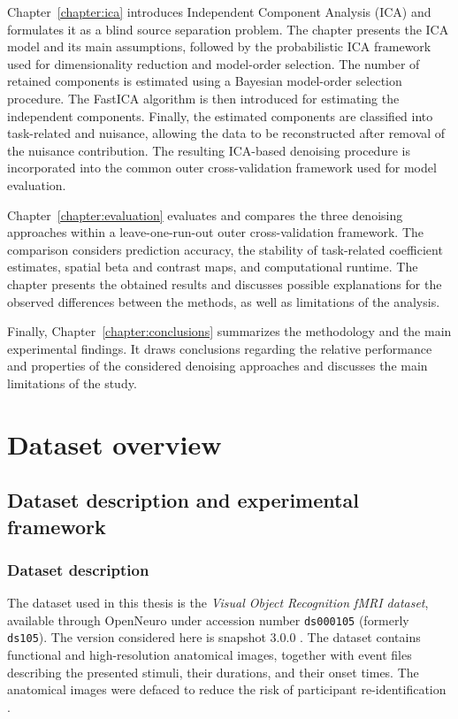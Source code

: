 \documentclass[english]{pwr_wmat_praca_dyplomowa}
\theoremstyle{definition}
\theoremstyle{remark}
\begin{document}
Chapter~\ref{chapter:ica} introduces Independent Component Analysis (ICA) and formulates it as a blind source separation problem. The chapter presents the ICA model and its main assumptions, followed by the probabilistic ICA framework used for dimensionality reduction and model-order selection. The number of retained components is estimated using a Bayesian model-order selection procedure. The FastICA algorithm is then introduced for estimating the independent components. Finally, the estimated components are classified into task-related and nuisance, allowing the data to be reconstructed after removal of the nuisance contribution. The resulting ICA-based denoising procedure is incorporated into the common outer cross-validation framework used for model evaluation.

Chapter~\ref{chapter:evaluation} evaluates and compares the three denoising approaches within a leave-one-run-out outer cross-validation framework. The comparison considers prediction accuracy, the stability of task-related coefficient estimates, spatial beta and contrast maps, and computational runtime. The chapter presents the obtained results and discusses possible explanations for the observed differences between the methods, as well as limitations of the analysis.

Finally, Chapter~\ref{chapter:conclusions} summarizes the methodology and the main experimental findings. It draws conclusions regarding the relative performance and properties of the considered denoising approaches and discusses the main limitations of the study.


\newpage
\chapter{Dataset overview}
\label{chapter:dataset}

\section{Dataset description and experimental framework}

\subsection{Dataset description}
\label{section:dataset-description}

The dataset used in this thesis is the \textit{Visual Object Recognition fMRI dataset}, available through OpenNeuro under accession number \texttt{ds000105} (formerly \texttt{ds105}). The version considered here is snapshot 3.0.0 \cite{MAIN_DATASET}. The dataset contains functional and high-resolution anatomical images, together with event files describing the presented stimuli, their durations, and their onset times. The anatomical images were defaced to reduce the risk of participant re-identification \cite{MAIN_DATASET}.
\end{document}
